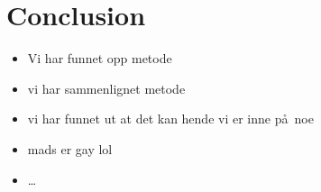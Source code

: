 \chapter{Conclusion}
\label{chapter:conclusion}
\begin{itemize}
  \item Vi har funnet opp metode
  \item vi har sammenlignet metode
  \item vi har funnet ut at det kan hende vi er inne p\aa~noe
  \item mads er gay lol
  \item \ldots
\end{itemize}